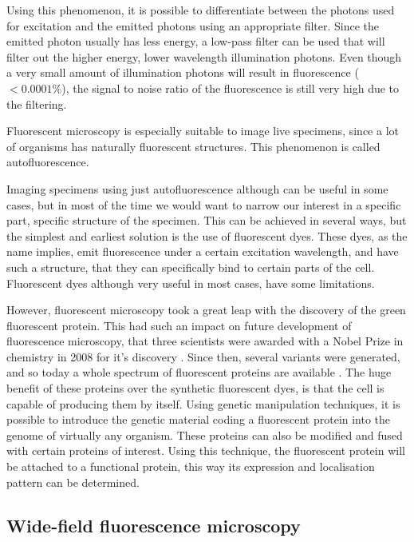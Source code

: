 \documentclass{diploma_style}
\begin{document}
Using this phenomenon, it is possible to differentiate between the photons used for excitation and the emitted photons using an appropriate filter. Since the emitted photon usually has less energy, a low-pass filter can be used that will filter out the higher energy, lower wavelength illumination photons. Even though a very small amount of illumination photons will result in fluorescence ($<0.0001\%$), the signal to noise ratio of the fluorescence is still very high due to the filtering.

Fluorescent microscopy is especially suitable to image live specimens, since a lot of organisms has naturally fluorescent structures. This phenomenon is called autofluorescence.

Imaging specimens using just autofluorescence although can be useful in some cases, but in most of the time we would want to narrow our interest in a specific part, specific structure of the specimen. This can be achieved in several ways, but the simplest and earliest solution is the use of fluorescent dyes. These dyes, as the name implies, emit fluorescence under a certain excitation wavelength, and have such a structure, that they can specifically bind to certain parts of the cell. Fluorescent dyes although very useful in most cases, have some limitations. 

However, fluorescent microscopy took a great leap with the discovery of the green fluorescent protein. This had such an impact on future development of fluorescence microscopy, that three scientists were awarded with a Nobel Prize in chemistry in 2008 for it's discovery \cite{service_three_2008}. Since then, several variants were generated, and so today a whole spectrum of fluorescent proteins are available \cite{shaner_guide_2005}. The huge benefit of these proteins over the synthetic fluorescent dyes, is that the cell is capable of producing them by itself. Using genetic manipulation techniques, it is possible to introduce the genetic material coding a fluorescent protein into the genome of virtually any organism. These proteins can also be modified and fused with certain proteins of interest. Using this technique, the fluorescent protein will be attached to a functional protein, this way its expression and localisation pattern can be determined.

\subsection{Wide-field fluorescence microscopy}
\end{document}
